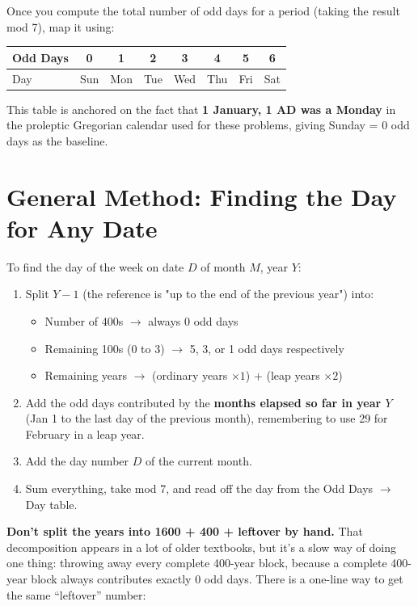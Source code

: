 \documentclass[11pt]{article}
\begin{document}
Once you compute the total number of odd days for a period (taking the result mod 7), map it using:

\begin{formulabox}
\centering
\begin{tabular}{lccccccc}
\toprule
Odd Days & 0 & 1 & 2 & 3 & 4 & 5 & 6 \\
\midrule
Day & Sun & Mon & Tue & Wed & Thu & Fri & Sat \\
\bottomrule
\end{tabular}
\end{formulabox}

This table is anchored on the fact that \textbf{1 January, 1 AD was a Monday} in the proleptic
Gregorian calendar used for these problems, giving Sunday = 0 odd days as the baseline.

\section{General Method: Finding the Day for Any Date}

To find the day of the week on date $D$ of month $M$, year $Y$:

\begin{formulabox}
\begin{enumerate}[leftmargin=1.4em]
  \item Split $Y - 1$ (the reference is "up to the end of the previous year") into:
    \begin{itemize}
      \item Number of 400s $\to$ always 0 odd days
      \item Remaining 100s (0 to 3) $\to$ 5, 3, or 1 odd days respectively
      \item Remaining years $\to$ (ordinary years $\times 1$) + (leap years $\times 2$)
    \end{itemize}
  \item Add the odd days contributed by the \textbf{months elapsed so far in year $Y$} (Jan 1 to the
    last day of the previous month), remembering to use 29 for February in a leap year.
  \item Add the day number $D$ of the current month.
  \item Sum everything, take mod 7, and read off the day from the Odd Days $\to$ Day table.
\end{enumerate}
\end{formulabox}

\textbf{Don't split the years into 1600 + 400 + leftover by hand.} That decomposition appears in a
lot of older textbooks, but it's a slow way of doing one thing: throwing away every complete
400-year block, because a complete 400-year block always contributes exactly 0 odd days. There is a
one-line way to get the same ``leftover'' number:
\end{document}
